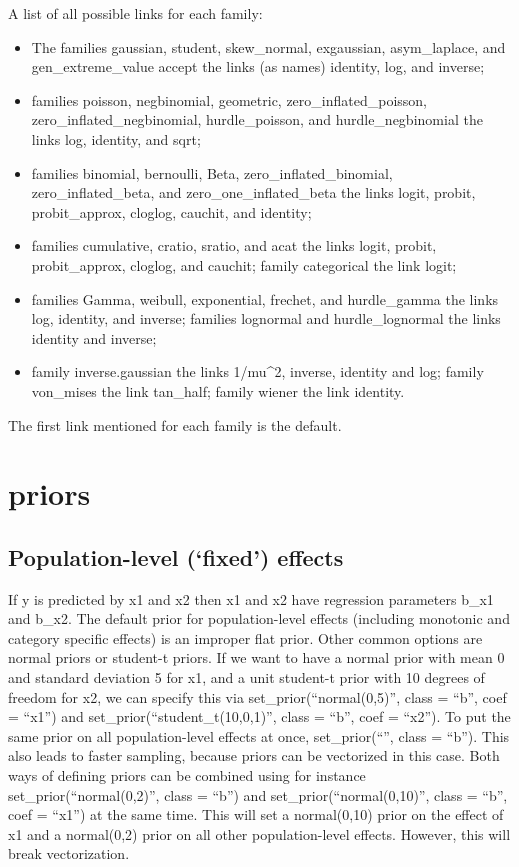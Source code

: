 \documentclass[]{book}
\begin{document}
A list of all possible links for each family:

\begin{itemize}
\item
  The families gaussian, student, skew\_normal, exgaussian,
  asym\_laplace, and gen\_extreme\_value accept the links (as names)
  identity, log, and inverse;
\item
  families poisson, negbinomial, geometric, zero\_inflated\_poisson,
  zero\_inflated\_negbinomial, hurdle\_poisson, and hurdle\_negbinomial
  the links log, identity, and sqrt;
\item
  families binomial, bernoulli, Beta, zero\_inflated\_binomial,
  zero\_inflated\_beta, and zero\_one\_inflated\_beta the links logit,
  probit, probit\_approx, cloglog, cauchit, and identity;
\item
  families cumulative, cratio, sratio, and acat the links logit, probit,
  probit\_approx, cloglog, and cauchit; family categorical the link
  logit;
\item
  families Gamma, weibull, exponential, frechet, and hurdle\_gamma the
  links log, identity, and inverse; families lognormal and
  hurdle\_lognormal the links identity and inverse;
\item
  family inverse.gaussian the links 1/mu\^{}2, inverse, identity and
  log; family von\_mises the link tan\_half; family wiener the link
  identity.
\end{itemize}

The first link mentioned for each family is the default.

\section{priors}\label{priors}

\subsection{\texorpdfstring{Population-level (`fixed')
effects}{Population-level (fixed) effects}}\label{population-level-fixed-effects}

If y is predicted by x1 and x2 then x1 and x2 have regression parameters
b\_x1 and b\_x2. The default prior for population-level effects
(including monotonic and category specific effects) is an improper flat
prior. Other common options are normal priors or student-t priors. If we
want to have a normal prior with mean 0 and standard deviation 5 for x1,
and a unit student-t prior with 10 degrees of freedom for x2, we can
specify this via set\_prior(``normal(0,5)'', class = ``b'', coef =
``x1'') and set\_prior(``student\_t(10,0,1)'', class = ``b'', coef =
``x2''). To put the same prior on all population-level effects at once,
set\_prior(``'', class = ``b''). This also leads to faster sampling,
because priors can be vectorized in this case. Both ways of defining
priors can be combined using for instance set\_prior(``normal(0,2)'',
class = ``b'') and set\_prior(``normal(0,10)'', class = ``b'', coef =
``x1'') at the same time. This will set a normal(0,10) prior on the
effect of x1 and a normal(0,2) prior on all other population-level
effects. However, this will break vectorization.
\end{document}
